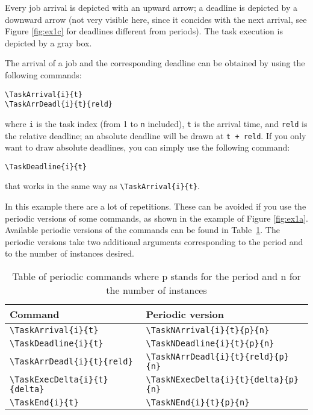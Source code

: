 \documentclass{article}
\begin{document}
Every job arrival is depicted with an upward arrow; a deadline is
depicted by a downward arrow (not very visible here, since it concides
with the next arrival, see Figure \ref{fig:ex1c} for deadlines
different from periods). The task execution is depicted by a gray box.

The arrival of a job and the corresponding deadline can be obtained by
using the following commands:
\begin{verbatim}
\TaskArrival{i}{t}
\TaskArrDeadl{i}{t}{reld}
\end{verbatim}
\noindent where \texttt{i} is the task index (from 1 to \texttt{n}
included), \texttt{t} is the arrival time, and \texttt{reld} is the
relative deadline; an absolute deadline will be drawn at \texttt{t +
  reld}. If you only want to draw absolute deadlines, you can simply use the following command:
\begin{verbatim}
\TaskDeadline{i}{t}
\end{verbatim}
\noindent that works in the same way as \verb+\TaskArrival{i}{t}+.


In this example there are a lot of repetitions. These can be avoided
if you use the periodic versions of some commands, as shown in the example of
Figure \ref{fig:ex1a}. Available periodic versions of the commands can be found in Table~\ref{tab:periodic_versions}. The periodic versions take two additional arguments corresponding to the period and to the number of instances desired.

\begin{table}[!htbp]
\begin{tabular}{|l|l|}
 \hline
  Command & Periodic version  \\
 \hline
 \verb+\TaskArrival{i}{t}+ & \verb+\TaskNArrival{i}{t}{p}{n}+ \\
 \verb+\TaskDeadline{i}{t}+ & \verb+\TaskNDeadline{i}{t}{p}{n}+ \\
 \verb+\TaskArrDeadl{i}{t}{reld}+ & \verb+\TaskNArrDeadl{i}{t}{reld}{p}{n}+  \\
 \verb+\TaskExecDelta{i}{t}{delta}+ & \verb+\TaskNExecDelta{i}{t}{delta}{p}{n}+\\
 \verb+\TaskEnd{i}{t}+ & \verb+\TaskNEnd{i}{t}{p}{n}+\\

  \hline
\end{tabular}
\caption{Table of periodic commands where p stands for the period and n for the number of instances}
\label{tab:periodic_versions}
\end{table}
\end{document}
